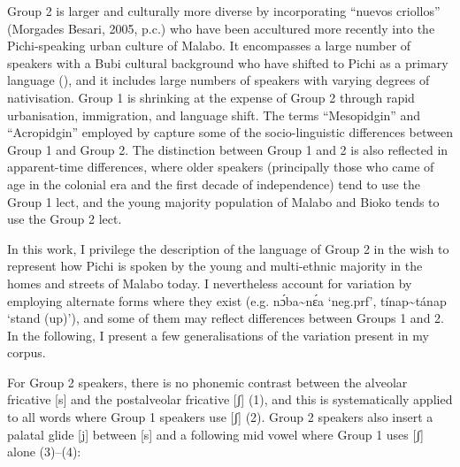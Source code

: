 Group 2 is larger and culturally more diverse by incorporating “nuevos criollos” (Morgades Besari, 2005, p.c.) who have been accultured more recently into the Pichi-speaking urban culture of Malabo. It encompasses a large number of speakers with a Bubi cultural background who have shifted to Pichi as a primary language (\citealt{BolekiaBoleká2007}), and it includes large numbers of speakers with varying degrees of nativisation. Group 1 is shrinking at the expense of Group 2 through rapid urbanisation, immigration, and language shift. The terms “Mesopidgin” and “Acropidgin” employed by \citet{MorgadesBesari2011} capture some of the socio-linguistic differences between Group 1 and Group 2. The distinction between Group 1 and 2 is also reflected in apparent-time differences, where older speakers (principally those who came of age in the colonial era and the first decade of independence) tend to use the Group 1 lect, and the young majority population of Malabo and Bioko tends to use the Group 2 lect. 



In this work, I privilege the description of the language of Group 2 in the wish to represent how Pichi is spoken by the young and multi-ethnic majority in the homes and streets of Malabo today. I nevertheless account for variation by employing alternate forms where they exist (e.g. nɔ́ba{\textasciitilde}nɛ́a ‘neg.prf’, tínap{\textasciitilde}tánap ‘stand (up)’), and some of them may reflect differences between Groups 1 and 2. In the following, I present a few generalisations of the variation present in my corpus. 



For Group 2 speakers, there is no phonemic contrast between the alveolar fricative [s] and the postalveolar fricative [ʃ] (1), and this is systematically applied to all words where Group 1 speakers use [ʃ] (2). Group 2 speakers also insert a palatal glide [j] between [s] and a following mid vowel where Group 1 uses [ʃ] alone (3)--(4):

